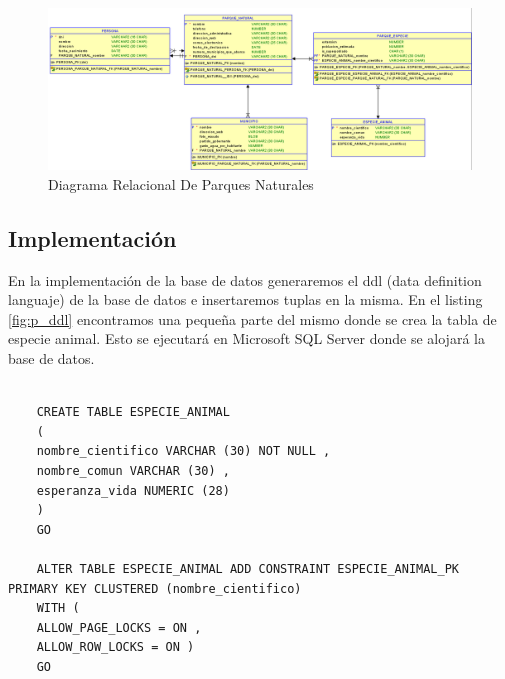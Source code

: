 \documentclass{article}
\begin{document}
\begin{figure}[H]
	\centering
	\includegraphics[width=\textwidth]{images/diagrama_relacional_parques_naturales.png}
	\caption{Diagrama Relacional De Parques Naturales}
	\label{fig:p_relacional}
\end{figure}

\subsection{Implementación}

En la implementación de la base de datos generaremos el ddl (data definition languaje) de la base de datos e insertaremos tuplas en la misma. En el listing \ref{fig:p_ddl} encontramos una pequeña parte del mismo donde se crea la tabla de especie animal. Esto se ejecutará en Microsoft SQL Server \cite{sqlserver2022} donde se alojará la base de datos.
\begin{lstlisting}[style=ddlstyle, label=fig:p_ddl,caption=Definicion De Datos De Parques Naturales]
	
	CREATE TABLE ESPECIE_ANIMAL 
	(
	nombre_cientifico VARCHAR (30) NOT NULL , 
	nombre_comun VARCHAR (30) , 
	esperanza_vida NUMERIC (28) 
	)
	GO
	
	ALTER TABLE ESPECIE_ANIMAL ADD CONSTRAINT ESPECIE_ANIMAL_PK PRIMARY KEY CLUSTERED (nombre_cientifico)
	WITH (
	ALLOW_PAGE_LOCKS = ON , 
	ALLOW_ROW_LOCKS = ON )
	GO
	
	
\end{lstlisting}
\newpage
\end{document}
